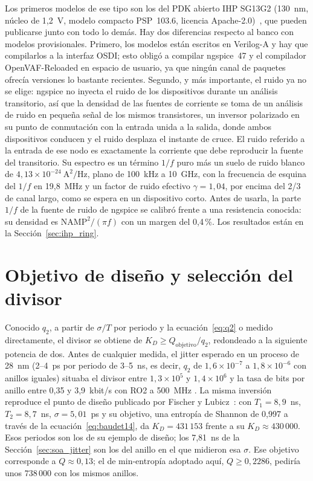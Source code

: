 Los primeros modelos de ese tipo son los del \ac{PDK} abierto IHP SG13G2
(130~nm, núcleo de 1,2~V, modelo compacto PSP~103.6, licencia
Apache-2.0)~\cite{ihp_openpdk_repo}, que pueden publicarse junto con todo
lo demás. Hay dos diferencias respecto al banco con modelos provisionales.
Primero, los modelos están escritos en Verilog-A y hay que compilarlos a
la interfaz OSDI; esto obligó a compilar ngspice~47 y el compilador
OpenVAF-Reloaded en espacio de usuario, ya que ningún canal de paquetes
ofrecía versiones lo bastante recientes. Segundo, y más importante, el
ruido ya no se elige: ngspice no inyecta el ruido de los dispositivos
durante un análisis transitorio, así que la densidad de las fuentes de
corriente se toma de un análisis de ruido en pequeña señal de los mismos
transistores, un inversor polarizado en su punto de conmutación con la
entrada unida a la salida, donde ambos dispositivos conducen y el ruido
desplaza el instante de cruce. El ruido referido a la entrada de ese nodo
es exactamente la corriente que debe reproducir la fuente del transitorio.
Su espectro es un término $1/f$ puro más un suelo de ruido blanco de
$4{,}13\times10^{-24}~\mathrm{A^2/Hz}$, plano de 100~kHz a 10~GHz, con la
frecuencia de esquina del $1/f$ en 19,8~MHz y un factor de ruido efectivo
$\gamma = 1{,}04$, por encima del 2/3 de canal largo, como se espera en un
dispositivo corto. Antes de usarla, la parte $1/f$ de la fuente de ruido
de ngspice se calibró frente a una resistencia conocida: su densidad es
$\mathrm{NAMP}^2/(\pi f)$ con un margen del 0,4\,\%. Los resultados están
en la Sección~\ref{sec:ihp_ring}.

\section{Objetivo de diseño y selección del divisor}
\label{sec:kd}

Conocido $q_2$, a partir de $\sigma/T$ por periodo y la
ecuación~\eqref{eq:q2} o medido directamente, el divisor se obtiene de
$K_D \ge Q_{\mathrm{objetivo}} / q_2$, redondeado a la siguiente potencia
de dos. Antes de cualquier medida, el jitter esperado en un proceso de
28~nm (2--4~ps por periodo de 3--5~ns, es decir, $q_2$ de
$1{,}6\times10^{-7}$ a $1{,}8\times10^{-6}$ con anillos iguales) situaba
el divisor entre $1{,}3\times10^5$ y $1{,}4\times10^6$ y la tasa de bits
por anillo entre 0,35 y 3,9~kbit/s con RO2 a 500~MHz \est{}. La misma inversión reproduce el punto
de diseño publicado por Fischer y Lubicz~\cite{fischer_2014_embedded}: con
$T_1 = 8{,}9$~ns, $T_2 = 8{,}7$~ns, $\sigma = 5{,}01$~ps y su objetivo,
una entropía de Shannon de 0,997 a través de la
ecuación~\eqref{eq:baudet14}, da $K_D = 431\,153$ frente a su
$K_D \approx 430\,000$. Esos periodos son los de su ejemplo de diseño;
los 7,81~ns de la Sección~\ref{sec:soa_jitter} son los del anillo en el
que midieron esa $\sigma$. Ese objetivo corresponde a $Q \approx 0{,}13$; el
de min-entropía adoptado aquí, $Q \ge 0{,}2286$, pediría unos $738\,000$
con los mismos anillos.

